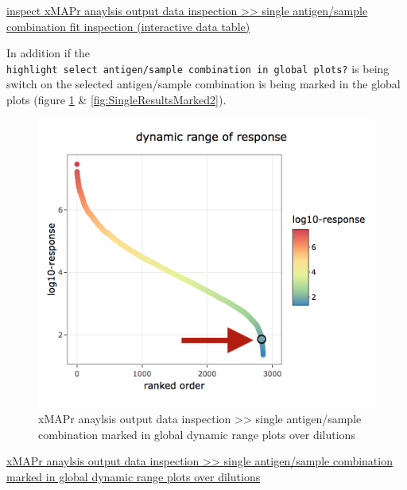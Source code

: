 \documentclass[]{book}
\theoremstyle{definition}
\theoremstyle{definition}
\theoremstyle{definition}
\theoremstyle{remark}
\begin{document}
\href{figures/inspect_single_results3.png}{inspect xMAPr anaylsis output
data inspection \textgreater{}\textgreater{} single antigen/sample
combination fit inspection (interactive data table)}

In addition if the
\texttt{highlight\ select\ antigen/sample\ combination\ in\ global\ plots?}
is being switch on the selected antigen/sample combination is being
marked in the global plots (figure \ref{fig:SingleResultsMarked1} \&
\ref{fig:SingleResultsMarked2}).

\begin{figure}
\includegraphics[width=13.5in]{figures/inspect_single_results2_dyn_range} \caption{xMAPr anaylsis output data inspection >> single antigen/sample combination marked in global dynamic range plots over dilutions}\label{fig:SingleResultsMarked1}
\end{figure}

\href{figures/inspect_single_results2_dyn_range.png}{xMAPr anaylsis
output data inspection \textgreater{}\textgreater{} single
antigen/sample combination marked in global dynamic range plots over
dilutions}
\end{document}

